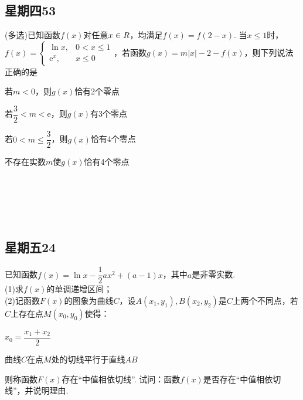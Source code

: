 \documentclass[UTF8,a4paper,11 pt]{ctexart}%
\newcommand\eu{\mathrm{e}}%
\let\mathbb\relax
\begin{document}
	\subsection{星期四53}\noindent
	(多选)已知函数$ f(x) $对任意$ x\in\mathbb{R} $，均满足$ f(x)=f(2-x) $. 当$ x\le1 $时，$ f(x)=\begin{cases}
		\ln x, &0<x\le1
		\\\eu^x,&x\le0
	\end{cases} $，若函数$ g(x)=m|x|-2-f(x) $，则下列说法正确的是
	\begin{xchoices}[label-style=Alph]
		\item 若$ m<0 $，则$ g(x) $恰有2个零点
		\item 若$ \dfrac{3}{2}<m<\eu $，则$ g(x) $有3个零点
		\item 若$ 0<m\le\dfrac{3}{2} $，则$ g(x) $恰有4个零点
		\item 不存在实数$ m $使$ g(x) $恰有4个零点
	\end{xchoices}\,\\\,\\\,\\\,
	\subsection{星期五24}\noindent
	已知函数$ f(x)=\ln x-\dfrac{1}{2}ax^2+(a-1)x $，其中$ a $是非零实数.
	\\(1)求$ f(x) $的单调递增区间；
	\\(2)记函数$ F(x) $的图象为曲线$ C $，设$ A(x_1,y_1), B(x_2,y_2) $是$ C $上两个不同点，若$ C $上存在点$ M(x_0,y_0) $使得：\begin{xchoices}[label-style=quan]
		\item $ x_0=\dfrac{x_1+x_2}{2} $
		\item 曲线$ C $在点$ M $处的切线平行于直线$ AB $
	\end{xchoices}\noindent
	则称函数$ F(x) $存在“中值相依切线”. 试问：函数$ f(x) $是否存在“中值相依切线”，并说明理由.
\end{document}
